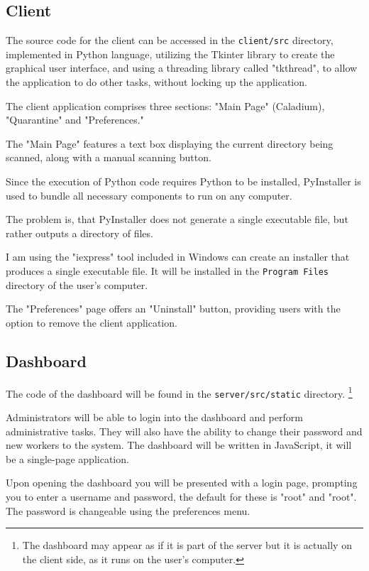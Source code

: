 \subsection{Client}
The source code for the client can be accessed in the \texttt{client/src} directory,
implemented in Python language, utilizing the Tkinter library to create the graphical user interface,
and using a threading library called "tkthread",
to allow the application to do other tasks, without locking up the application.

The client application comprises three sections: "Main Page" (Caladium), "Quarantine" and "Preferences."

The "Main Page" features a text box displaying the current directory being scanned,
along with a manual scanning button.

Since the execution of Python code requires Python to be installed,
PyInstaller is used to bundle all necessary components to run on any computer.

The problem is, that PyInstaller does not generate a single executable file,
but rather outputs a directory of files.

I am using the "iexpress" tool included in Windows can
create an installer that produces a single executable file.
It will be installed in the \texttt{Program Files} directory of the user's computer.

The "Preferences" page offers an "Uninstall" button,
providing users with the option to remove the client application.

\subsection{Dashboard}
The code of the dashboard will be found in the \texttt{server/src/static} directory.
\footnote{The dashboard may appear as if it is part of the server
but it is actually on the client side, as it runs on the user's computer.}

Administrators will be able to login into the dashboard and perform administrative tasks.
They will also have the ability to change their password and new workers to the system.
The dashboard will be written in JavaScript, it will be a single-page application.

Upon opening the dashboard you will be presented with a login page,
prompting you to enter a username and password, the default for these is "root" and "root".
The password is changeable using the preferences menu.

